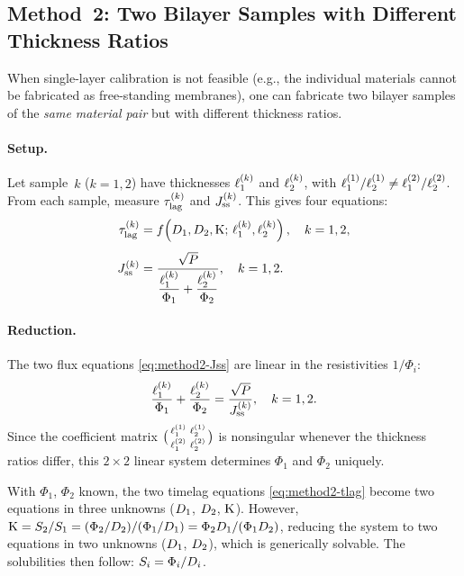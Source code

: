 \subsection{Method~2: Two Bilayer Samples with Different Thickness Ratios}
\label{sec:method2}

When single-layer calibration is not feasible (e.g., the individual materials
cannot be fabricated as free-standing membranes), one can fabricate two bilayer
samples of the \emph{same material pair} but with different thickness ratios.

\paragraph{Setup.}
Let sample~$k$ ($k = 1,2$) have thicknesses $\ell_{1}^{(k)}$ and
$\ell_{2}^{(k)}$, with $\ell_{1}^{(1)}/\ell_{2}^{(1)} \neq
\ell_{1}^{(2)}/\ell_{2}^{(2)}$.  From each sample, measure $\tau_{\mathrm{lag}}^{(k)}$ and
$J_{\mathrm{ss}}^{(k)}$.  This gives four equations:
\begin{align}
  \label{eq:method2-tlag}
  \tau_{\mathrm{lag}}^{(k)} &= f\!\left(D_{1},D_{2},\mathrm{K};\,
    \ell_{1}^{(k)},\ell_{2}^{(k)}\right),
    \quad k=1,2,\\[4pt]
  \label{eq:method2-Jss}
  J_{\mathrm{ss}}^{(k)} &= \frac{\sqrt{P}}{\dfrac{\ell_{1}^{(k)}}{\Phi_1}
    + \dfrac{\ell_{2}^{(k)}}{\Phi_2}},
    \quad k=1,2.
\end{align}

\paragraph{Reduction.}
The two flux equations \cref{eq:method2-Jss} are linear in the resistivities
$1/\Phi_i$:
\begin{equation}
  \label{eq:method2-flux-system}
  \frac{\ell_{1}^{(k)}}{\Phi_1} + \frac{\ell_{2}^{(k)}}{\Phi_2}
  = \frac{\sqrt{P}}{J_{\mathrm{ss}}^{(k)}}, \quad k=1,2.
\end{equation}
Since the coefficient matrix
$\bigl(\begin{smallmatrix}\ell_{1}^{(1)}&\ell_{2}^{(1)}\\
\ell_{1}^{(2)}&\ell_{2}^{(2)}\end{smallmatrix}\bigr)$ is nonsingular whenever the
thickness ratios differ, this $2\times 2$ linear system determines $\Phi_1$ and
$\Phi_2$ uniquely.

With $\Phi_1$, $\Phi_2$ known, the two timelag equations
\cref{eq:method2-tlag} become two equations in three unknowns ($D_{1}$,
$D_{2}$, $\mathrm{K}$).  However, $\mathrm{K} = S_{2}/S_{1} =
(\Phi_2/D_{2})/(\Phi_1/D_{1}) = \Phi_2D_{1}/(\Phi_1D_{2})$, reducing the
system to two equations in two unknowns ($D_{1}$, $D_{2}$), which is
generically solvable.  The solubilities then follow:
$S_{i} = \Phi_i/D_{i}$.

